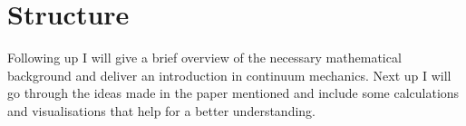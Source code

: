 \section{Structure}
Following up I will give a brief overview of the necessary mathematical background and deliver an introduction in continuum mechanics. Next up I will go through the ideas made in the paper mentioned and include some calculations and visualisations that help for a better understanding. \\


